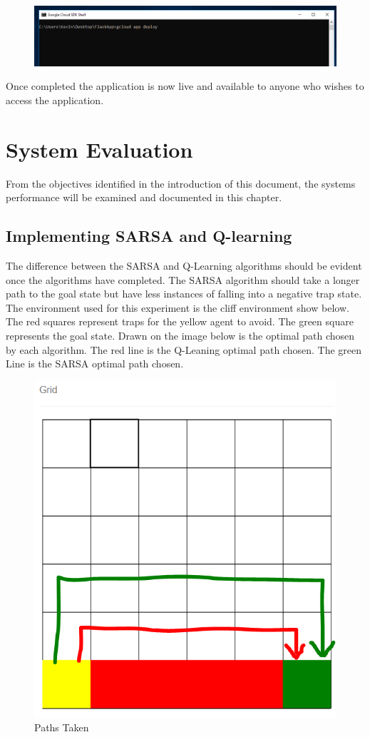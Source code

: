 \begin{figure}[H]
	\centering
	\includegraphics[width=1\linewidth]{img/DeployCmd}
	\caption{}
	\label{fig:deploycmd}
\end{figure}
Once completed the application is now live and available to anyone who wishes to access the application.



\chapter{System Evaluation}
From the objectives identified in the introduction of this document, the systems performance will be examined and documented in this chapter.
\section{Implementing SARSA and Q-learning}
The difference between the SARSA and Q-Learning algorithms should be evident once the algorithms have completed. The SARSA algorithm should take a longer path to the goal state but have less instances of falling into a negative trap state.
The environment used for this experiment is the cliff environment show below. The red squares represent traps for the yellow agent to avoid. The green square represents the goal state. Drawn on the image below is the optimal path chosen by each algorithm. The red line is the Q-Leaning optimal path chosen. The green Line is the SARSA optimal path chosen.
\begin{figure}[H]
	\centering
	\includegraphics[width=0.7\linewidth]{img/pathOptimal}
	\caption{Paths Taken}
	\label{fig:pathoptimal}
\end{figure}


